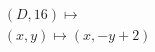 \documentclass[preview]{standalone}
\begin{document}
\begin{align*}
&(D,16) \mapsto \\& (x,y) \mapsto (x, -y + 2)
\end{align*}
\end{document}
